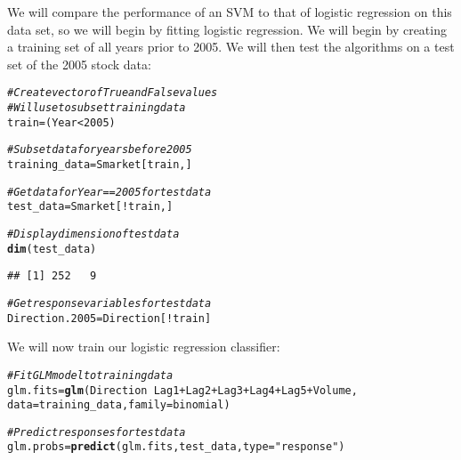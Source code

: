 \documentclass[12pt]{article}\usepackage[]{graphicx}\usepackage[]{color}
\makeatletter
\newcommand{\hlnum}[1]{\textcolor[rgb]{0.686,0.059,0.569}{#1}}%
\newcommand{\hlstr}[1]{\textcolor[rgb]{0.192,0.494,0.8}{#1}}%
\newcommand{\hlcom}[1]{\textcolor[rgb]{0.678,0.584,0.686}{\textit{#1}}}%
\newcommand{\hlopt}[1]{\textcolor[rgb]{0,0,0}{#1}}%
\newcommand{\hlstd}[1]{\textcolor[rgb]{0.345,0.345,0.345}{#1}}%
\newcommand{\hlkwb}[1]{\textcolor[rgb]{0.69,0.353,0.396}{#1}}%
\newcommand{\hlkwc}[1]{\textcolor[rgb]{0.333,0.667,0.333}{#1}}%
\newcommand{\hlkwd}[1]{\textcolor[rgb]{0.737,0.353,0.396}{\textbf{#1}}}%
\newenvironment{kframe}{%
 \def\at@end@of@kframe{}%
 \ifinner\ifhmode%
  \def\at@end@of@kframe{\end{minipage}}%
  \begin{minipage}{\columnwidth}%
 \fi\fi%
 \def\FrameCommand##1{\hskip\@totalleftmargin \hskip-\fboxsep
 \colorbox{shadecolor}{##1}\hskip-\fboxsep
     \hskip-\linewidth \hskip-\@totalleftmargin \hskip\columnwidth}%
 \MakeFramed {\advance\hsize-\width
   \@totalleftmargin\z@ \linewidth\hsize
   \@setminipage}}%
 {\par\unskip\endMakeFramed%
 \at@end@of@kframe}
\newenvironment{knitrout}{}{} %
\makeatother
\begin{document}
We will compare the performance of an SVM to that of logistic regression on this data set, so we will begin by fitting logistic regression. We will begin by creating a training set of all years prior to 2005. We will then test the algorithms on a test set of the 2005 stock data:

\begin{knitrout}
\color{fgcolor}\begin{kframe}
\begin{alltt}
\hlcom{#Create vector of True and False values}
\hlcom{#Will use to subset training data}
\hlstd{train} \hlkwb{=} \hlstd{(Year}\hlopt{<}\hlnum{2005}\hlstd{)}

\hlcom{#Subset data for years before 2005}
\hlstd{training_data} \hlkwb{=} \hlstd{Smarket[train,]}

\hlcom{#Get data for Year == 2005 for test data}
\hlstd{test_data} \hlkwb{=} \hlstd{Smarket[}\hlopt{!}\hlstd{train,]}

\hlcom{#Display dimension of test data}
\hlkwd{dim}\hlstd{(test_data)}
\end{alltt}
\begin{verbatim}
## [1] 252   9
\end{verbatim}
\begin{alltt}
\hlcom{#Get response variables for test data}
\hlstd{Direction.2005} \hlkwb{=} \hlstd{Direction[}\hlopt{!}\hlstd{train]}
\end{alltt}
\end{kframe}
\end{knitrout}

We will now train our logistic regression classifier:
\begin{knitrout}
\color{fgcolor}\begin{kframe}
\begin{alltt}
\hlcom{#Fit GLM model to training data}
\hlstd{glm.fits} \hlkwb{=} \hlkwd{glm}\hlstd{(Direction}\hlopt{~}\hlstd{Lag1} \hlopt{+} \hlstd{Lag2} \hlopt{+} \hlstd{Lag3} \hlopt{+} \hlstd{Lag4} \hlopt{+} \hlstd{Lag5} \hlopt{+} \hlstd{Volume,}
               \hlkwc{data} \hlstd{= training_data,} \hlkwc{family} \hlstd{= binomial)}

\hlcom{#Predict responses for test data}
\hlstd{glm.probs} \hlkwb{=} \hlkwd{predict}\hlstd{(glm.fits, test_data,} \hlkwc{type}\hlstd{=}\hlstr{"response"}\hlstd{)}
\end{alltt}
\end{kframe}
\end{knitrout}
\end{document}
